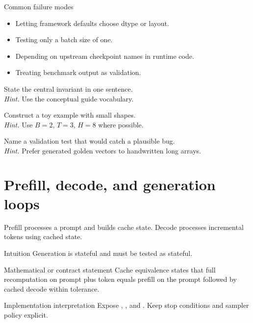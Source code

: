 \begin{warningbox}{Common failure modes}
\begin{itemize}
\item Letting framework defaults choose dtype or layout.
\item Testing only a batch size of one.
\item Depending on upstream checkpoint names in runtime code.
\item Treating benchmark output as validation.
\end{itemize}
\end{warningbox}

\begin{chapterexercises}
\item State the central invariant in one sentence.\\
\textit{Hint.} Use the conceptual guide vocabulary.
\item Construct a toy example with small shapes.\\
\textit{Hint.} Use $B=2$, $T=3$, $H=8$ where possible.
\item Name a validation test that would catch a plausible bug.\\
\textit{Hint.} Prefer generated golden vectors to handwritten long arrays.
\end{chapterexercises}

\chapter{Prefill, decode, and generation loops}
\label{ch:prefill-decode}
Prefill processes a prompt and builds cache state. Decode processes incremental tokens using cached state.



\begin{intuitionbox}{Intuition}
Generation is stateful and must be tested as stateful.
\end{intuitionbox}

\begin{definitionbox}{Mathematical or contract statement}
Cache equivalence states that full recomputation on prompt plus token equals prefill on the prompt followed by cached decode within tolerance.
\end{definitionbox}

\begin{implementationbox}{Implementation interpretation}
Expose , , and . Keep stop conditions and sampler policy explicit.
\end{implementationbox}

